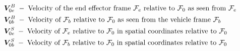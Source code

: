 \begin{mdframed}[style=graybox]
\begin{align}
&	\boldsymbol V_{0e}^B\; - \; \text{Velocity of the end effector frame \ensuremath{\mathcal{F}_{e}} relative to \ensuremath{\mathcal{F}_{0}} as seen from \ensuremath{\mathcal{F}_{e}}} \nonumber
\\
& \boldsymbol V_{0b}^B\; - \; \text{Velocity of \ensuremath{\mathcal{F}_{b}} relative to \ensuremath{\mathcal{F}_{0}} as seen from the vehicle frame \ensuremath{\mathcal{F}_{b}}} \nonumber
\\
&	\boldsymbol V_{0e}^S\; - \; \text{Velocity of \ensuremath{\mathcal{F}_{e}} relative to \ensuremath{\mathcal{F}_{0}} in spatial coordinates relative to \ensuremath{\mathcal{F}_{0}}} \nonumber
\\
&	\boldsymbol V_{0b}^S\; - \; \text{Velocity of \ensuremath{\mathcal{F}_{b}} relative to \ensuremath{\mathcal{F}_{0}} in spatial coordinates relative to \ensuremath{\mathcal{F}_{0}}} \nonumber
\end{align}

\end{mdframed}



